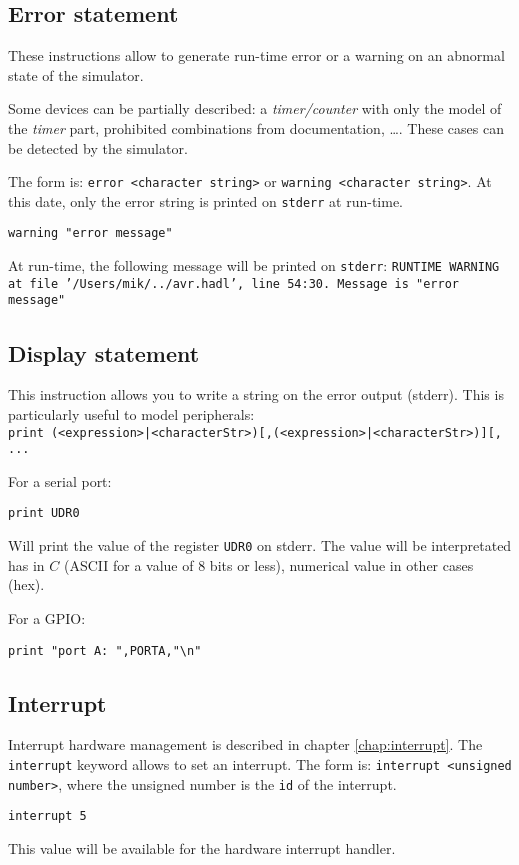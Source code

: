 \subsection{Error statement}
\label{sec:instError}
These instructions allow to generate run-time error or a warning on an abnormal state of the simulator.

Some devices can be partially described: a \emph{timer/counter} with only the model of the \emph{timer} part, prohibited combinations from documentation, \ldots. These cases can be detected by the simulator. 

The form is: \texttt{error <character string>} or \texttt{warning <character string>}. 
At this date, only the error string is printed on \texttt{stderr} at run-time.

\begin{lstlisting}
warning "error message"
\end{lstlisting}

At run-time, the following message will be printed on \texttt{stderr}: 
\texttt{RUNTIME WARNING at file '/Users/mik/../avr.hadl', line 54:30. Message is "error message"}

\subsection{Display statement}
This instruction allows you to write a string on the error output (stderr). This is particularly useful to model peripherals: \\
\texttt{print (<expression>|<characterStr>)[,(<expression>|<characterStr>)][, ...} 

For a serial port: 
\begin{lstlisting}
print UDR0
\end{lstlisting}
Will print the value of the register \texttt{UDR0} on stderr. The value will be interpretated has in $C$ (ASCII for a value of 8 bits or less), numerical value in other cases (hex).

For a GPIO:
\begin{lstlisting}
print "port A: ",PORTA,"\n"
\end{lstlisting}

\subsection{Interrupt}
\label{keyword:interrupt}
Interrupt hardware management is described in chapter \ref{chap:interrupt}. The \texttt{interrupt} keyword allows to set an interrupt. 
The form is: \texttt{interrupt <unsigned number>}, where the unsigned number is the \texttt{id} of the interrupt.
\begin{lstlisting}
interrupt 5
\end{lstlisting}
This value will be available for the hardware interrupt handler.


